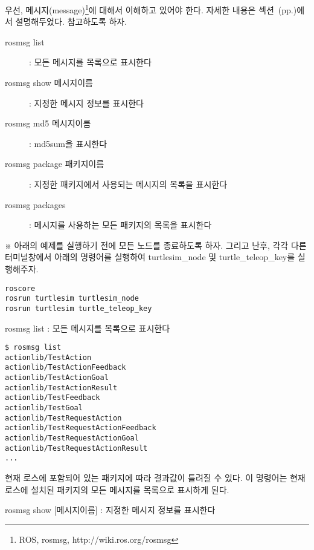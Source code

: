 우선, 메시지(message)\footnote{ROS, rosmsg, http://wiki.ros.org/rosmsg}에 대해서 이해하고 있어야 한다. 자세한 내용은 섹션~(pp.\pageref{def:RosMessage})에서 설명해두었다. 참고하도록 하자.

\vspace{\baselineskip}
\noindent
\begin{description}
\item[rosmsg list] : 모든 메시지를 목록으로 표시한다
\item[rosmsg show 메시지이름] : 지정한 메시지 정보를 표시한다
\item[rosmsg md5 메시지이름] : md5sum을 표시한다
\item[rosmsg package 패키지이름] : 지정한 패키지에서 사용되는 메시지의 목록을 표시한다
\item[rosmsg packages] : 메시지를 사용하는 모든 패키지의 목록을 표시한다
\end{description}

\vspace{\baselineskip}
\noindent
※ 아래의 예제를 실행하기 전에 모든 노드를 종료하도록 하자. 그리고 난후, 각각 다른 터미널창에서 아래의 명령어를 실행하여 turtlesim\_node 및 turtle\_teleop\_key를 실행해주자.

\begin{lstlisting}[language=ROS]
roscore
rosrun turtlesim turtlesim_node 
rosrun turtlesim turtle_teleop_key
\end{lstlisting}

\setcounter{num}{0}

\vspace{\baselineskip}
\noindent
{}\circled{\thenum} rosmsg list : 모든 메시지를 목록으로 표시한다

\begin{lstlisting}[language=ROS]
$ rosmsg list
actionlib/TestAction
actionlib/TestActionFeedback
actionlib/TestActionGoal
actionlib/TestActionResult
actionlib/TestFeedback
actionlib/TestGoal
actionlib/TestRequestAction
actionlib/TestRequestActionFeedback
actionlib/TestRequestActionGoal
actionlib/TestRequestActionResult
...
\end{lstlisting}

\noindent
현재 로스에 포함되어 있는 패키지에 따라 결과값이 틀려질 수 있다. 이 명령어는 현재 로스에 설치된 패키지의 모든 메시지를 목록으로 표시하게 된다.

\vspace{\baselineskip}
\noindent
{}\circled{\thenum} rosmsg show [메시지이름] : 지정한 메시지 정보를 표시한다

